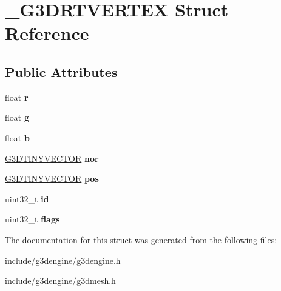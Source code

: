 \hypertarget{struct__G3DRTVERTEX}{}\section{\+\_\+\+G3\+D\+R\+T\+V\+E\+R\+T\+EX Struct Reference}
\label{struct__G3DRTVERTEX}
\subsection*{Public Attributes}
\begin{DoxyCompactItemize}
\item 
\mbox{\label{struct__G3DRTVERTEX_a48f80988544cba41bbde636b188bb86e}} 
float {\bfseries r}
\item 
\mbox{\label{struct__G3DRTVERTEX_a2c35305040f9b5ccb6d3c48f1cbe6455}} 
float {\bfseries g}
\item 
\mbox{\label{struct__G3DRTVERTEX_a0684976f953e9fc086d7ea75f82c422a}} 
float {\bfseries b}
\item 
\mbox{\label{struct__G3DRTVERTEX_aa81cc9c95673878bbbcdefea11c8c15e}} 
\hyperlink{structG3DTINYVECTOR}{G3\+D\+T\+I\+N\+Y\+V\+E\+C\+T\+OR} {\bfseries nor}
\item 
\mbox{\label{struct__G3DRTVERTEX_a002f1117ff092f49c28294081244ba5c}} 
\hyperlink{structG3DTINYVECTOR}{G3\+D\+T\+I\+N\+Y\+V\+E\+C\+T\+OR} {\bfseries pos}
\item 
\mbox{\label{struct__G3DRTVERTEX_a9e239d4d051bef8607eb199d736ea549}} 
uint32\+\_\+t {\bfseries id}
\item 
\mbox{\label{struct__G3DRTVERTEX_a00c7feffa675128bd7c82ff0151333c6}} 
uint32\+\_\+t {\bfseries flags}
\end{DoxyCompactItemize}


The documentation for this struct was generated from the following files\+:\begin{DoxyCompactItemize}
\item 
include/g3dengine/g3dengine.\+h\item 
include/g3dengine/g3dmesh.\+h\end{DoxyCompactItemize}
